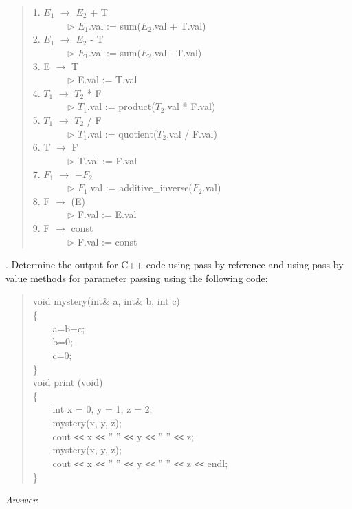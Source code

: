 \documentclass[a4paper,12pt]{article}
\begin{document}
\begin{quote}
1. $E_1$ $\longrightarrow$ $E_2$ + T \\
\verb+       +$\triangleright$ $E_1$.val := sum($E_2$.val + T.val)\\
2. $E_1$ $\longrightarrow$ $E_2$ - T \\
\verb+       +$\triangleright$ $E_1$.val := sum($E_2$.val - T.val)\\
3. E $\longrightarrow$  T \\
\verb+       +$\triangleright$ E.val := T.val\\
4. $T_1$ $\longrightarrow$ $T_2$ * F \\
\verb+       +$\triangleright$ $T_1$.val := product($T_2$.val * F.val)\\
5. $T_1$ $\longrightarrow$ $T_2$ / F \\
\verb+       +$\triangleright$ $T_1$.val := quotient($T_2$.val / F.val)\\
6. T $\longrightarrow$  F \\
\verb+       +$\triangleright$ T.val := F.val\\
7. $F_1$ $\longrightarrow$ $-F_2$\\
\verb+       +$\triangleright$ $F_1$.val := additive\_inverse($F_2$.val)\\
8. F $\longrightarrow$  (E) \\
\verb+       +$\triangleright$ F.val := E.val\\
9. F $\longrightarrow$ const\\
\verb+       +$\triangleright$ F.val := const\\
\end{quote}

. Determine the output for C++ code using pass-by-reference and using
pass-by-value methods for parameter passing using the following code:\\
\begin{quote}
void mystery(int\& a, int\& b, int c)\\
\{\\
\verb|    |a=b+c;\\
\verb|    |b=0;\\
\verb|    |c=0;\\
\}\\
void print (void)\\
\{\\
\verb|    |int x = 0, y = 1, z = 2;\\
\verb|    |mystery(x, y, z);\\
\verb|    |cout \verb|<<| x \verb|<<| ''  ''   \verb|<<| y \verb|<<| ''  '' \verb|<<| z;\\
\verb|    |mystery(x, y, z);\\
\verb|    |cout \verb|<<| x \verb|<<| ''  '' \verb|<<| y \verb|<<| ''  '' \verb|<<| z \verb|<<| endl;\\
\}\\
\end{quote}
\emph{Answer}:
\end{document}
